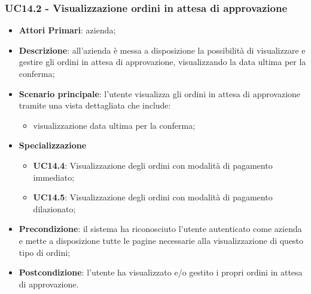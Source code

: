 
\subsubsection{UC14.2 - Visualizzazione ordini in attesa di approvazione}
\begin{itemize}
	\item \textbf{Attori Primari}: azienda;
	\item \textbf{Descrizione}: all'azienda è messa a disposizione la possibilità di visualizzare e gestire gli ordini in attesa di approvazione, visualizzando la data ultima per la conferma;
	\item \textbf{Scenario principale}: l'utente visualizza gli ordini in attesa di approvazione tramite una vista dettagliata che include: 
		\begin{itemize}
		\item visualizzazione data ultima per la conferma;
	\end{itemize}
		\item \textbf{Specializzazione}
	\begin{itemize}
		\item \textbf{UC14.4}: Visualizzazione degli ordini con modalità di pagamento immediato;
		\item \textbf{UC14.5}: Visualizzazione degli ordini con modalità di pagamento dilazionato;
	\end{itemize}
	\item \textbf{Precondizione}: il sistema ha riconosciuto l'utente autenticato come azienda e mette a disposizione tutte le pagine necessarie alla visualizzazione di questo tipo di ordini;
	\item \textbf{Postcondizione}: l'utente ha visualizzato e/o gestito i propri ordini in attesa di approvazione.
\end{itemize} 

